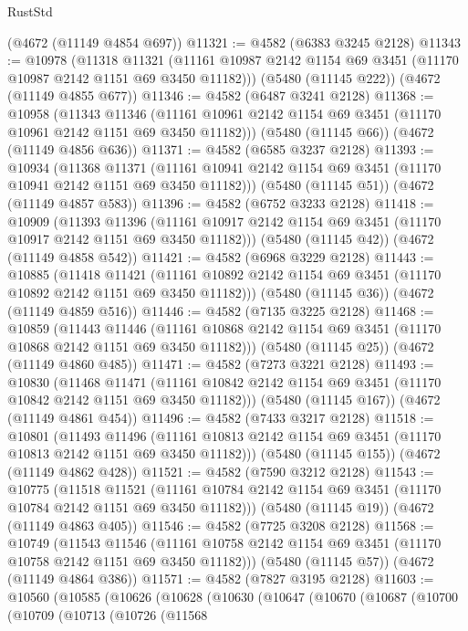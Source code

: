 \begin{lexlean}{RustStd}
\begin{coremodule}
{\begin{coremodule}
{{{{{{{{{{{{{{{{    (@4672 (@11149 @4854 @697))
@11321 := @4582 (@6383 @3245 @2128)
@11343 := @10978
    (@11318
      @11321
      (@11161 @10987 @2142 @1154 @69 @3451 (@11170 @10987 @2142 @1151 @69 @3450 @11182)))
    (@5480 (@11145 @222))
    (@4672 (@11149 @4855 @677))
@11346 := @4582 (@6487 @3241 @2128)
@11368 := @10958
    (@11343
      @11346
      (@11161 @10961 @2142 @1154 @69 @3451 (@11170 @10961 @2142 @1151 @69 @3450 @11182)))
    (@5480 (@11145 @66))
    (@4672 (@11149 @4856 @636))
@11371 := @4582 (@6585 @3237 @2128)
@11393 := @10934
    (@11368
      @11371
      (@11161 @10941 @2142 @1154 @69 @3451 (@11170 @10941 @2142 @1151 @69 @3450 @11182)))
    (@5480 (@11145 @51))
    (@4672 (@11149 @4857 @583))
@11396 := @4582 (@6752 @3233 @2128)
@11418 := @10909
    (@11393
      @11396
      (@11161 @10917 @2142 @1154 @69 @3451 (@11170 @10917 @2142 @1151 @69 @3450 @11182)))
    (@5480 (@11145 @42))
    (@4672 (@11149 @4858 @542))
@11421 := @4582 (@6968 @3229 @2128)
@11443 := @10885
    (@11418
      @11421
      (@11161 @10892 @2142 @1154 @69 @3451 (@11170 @10892 @2142 @1151 @69 @3450 @11182)))
    (@5480 (@11145 @36))
    (@4672 (@11149 @4859 @516))
@11446 := @4582 (@7135 @3225 @2128)
@11468 := @10859
    (@11443
      @11446
      (@11161 @10868 @2142 @1154 @69 @3451 (@11170 @10868 @2142 @1151 @69 @3450 @11182)))
    (@5480 (@11145 @25))
    (@4672 (@11149 @4860 @485))
@11471 := @4582 (@7273 @3221 @2128)
@11493 := @10830
    (@11468
      @11471
      (@11161 @10842 @2142 @1154 @69 @3451 (@11170 @10842 @2142 @1151 @69 @3450 @11182)))
    (@5480 (@11145 @167))
    (@4672 (@11149 @4861 @454))
@11496 := @4582 (@7433 @3217 @2128)
@11518 := @10801
    (@11493
      @11496
      (@11161 @10813 @2142 @1154 @69 @3451 (@11170 @10813 @2142 @1151 @69 @3450 @11182)))
    (@5480 (@11145 @155))
    (@4672 (@11149 @4862 @428))
@11521 := @4582 (@7590 @3212 @2128)
@11543 := @10775
    (@11518
      @11521
      (@11161 @10784 @2142 @1154 @69 @3451 (@11170 @10784 @2142 @1151 @69 @3450 @11182)))
    (@5480 (@11145 @19))
    (@4672 (@11149 @4863 @405))
@11546 := @4582 (@7725 @3208 @2128)
@11568 := @10749
    (@11543
      @11546
      (@11161 @10758 @2142 @1154 @69 @3451 (@11170 @10758 @2142 @1151 @69 @3450 @11182)))
    (@5480 (@11145 @57))
    (@4672 (@11149 @4864 @386))
@11571 := @4582 (@7827 @3195 @2128)
@11603 := @10560
    (@10585
      (@10626
        (@10628
          (@10630
            (@10647
              (@10670
                (@10687
                  (@10700
                    (@10709
                      (@10713
                        (@10726
                          (@11568
}}}}}}}}}}}}}}}}
\end{coremodule}}
\end{coremodule}
\end{lexlean}
